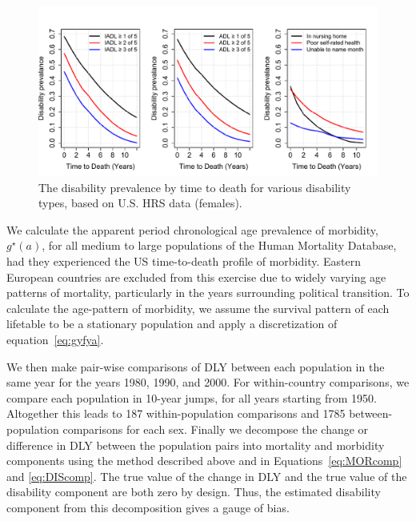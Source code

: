\documentclass[11pt,oneside,a4paper]{article} %
\begin{document}
\begin{figure}
\begin{adjustwidth}{-1.5cm}{}
	\centering
	\includegraphics[scale=.6]{Figures/DisbyTTD.pdf}
	\caption{The disability prevalence by time to death for various disability types, based on U.S. HRS data (females).}
	\label{fig:DisbyTTD}
\end{adjustwidth}
\end{figure}


We calculate the apparent period chronological age prevalence of morbidity,
$g^\star(a)$, for all medium to large populations of the Human Mortality
Database, had they experienced the US time-to-death profile of morbidity. Eastern European countries are excluded from this exercise due to widely varying
age patterns of mortality, particularly in the years surrounding political
transition. To calculate the age-pattern of morbidity, we assume the survival
pattern of each lifetable to be a stationary population and apply a
discretization of equation~\eqref{eq:gyfya}. 

We then make pair-wise comparisons of DLY between each population in
the same year for the years 1980, 1990, and 2000.
For within-country comparisons, we compare each population in
10-year jumps, for all years starting from 1950. Altogether this leads to
187 within-population comparisons and 1785 between-population comparisons for
each sex. Finally we decompose the change or difference in DLY between the
population pairs into mortality and morbidity components using the
\citet{Nusselder2004} method described above and in
Equations~\eqref{eq:MORcomp} and \eqref{eq:DIScomp}. The
true value of the change in DLY and the true value of the disability component
are both zero by design. Thus, the estimated disability component from this
decomposition gives a gauge of bias.
\end{document}
